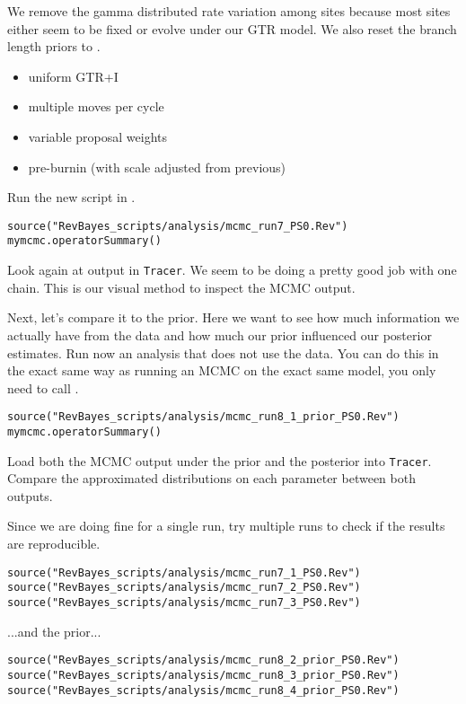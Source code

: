 We remove the gamma distributed rate variation among sites because most sites either seem to be fixed or evolve under our GTR model.
We also reset the branch length priors to .
\begin{itemize}
\item{uniform GTR+I}
\item{multiple moves per cycle}
\item{variable proposal weights}
\item{pre-burnin (with scale adjusted from previous)}
\end{itemize}
Run the new script in \RevBayes.
{\tt \begin{snugshade*}
\begin{lstlisting}
source("RevBayes_scripts/analysis/mcmc_run7_PS0.Rev")
mymcmc.operatorSummary()
\end{lstlisting}
\end{snugshade*}}
Look again at output in \verb!Tracer!.
We seem to be doing a pretty good job with one chain.
This is our visual method to inspect the MCMC output. 

Next, let's compare it to the prior.
Here we want to see how much information we actually have from the data and how much our prior influenced our posterior estimates.
Run now an analysis that does not use the data.
You can do this in \RevBayes the exact same way as running an MCMC on the exact same model, you only need to call .
{\tt \begin{snugshade*}
\begin{lstlisting}
source("RevBayes_scripts/analysis/mcmc_run8_1_prior_PS0.Rev")
mymcmc.operatorSummary()
\end{lstlisting}
\end{snugshade*}}
Load both the MCMC output under the prior and the posterior into \verb!Tracer!.
Compare the approximated distributions on each parameter between both outputs.

Since we are doing fine for a single run, try multiple runs to check if the results are reproducible.
{\tt \begin{snugshade*}
\begin{lstlisting}
source("RevBayes_scripts/analysis/mcmc_run7_1_PS0.Rev")
source("RevBayes_scripts/analysis/mcmc_run7_2_PS0.Rev")
source("RevBayes_scripts/analysis/mcmc_run7_3_PS0.Rev")
\end{lstlisting}
\end{snugshade*}}
...and the prior...
{\tt \begin{snugshade*}
\begin{lstlisting}
source("RevBayes_scripts/analysis/mcmc_run8_2_prior_PS0.Rev")
source("RevBayes_scripts/analysis/mcmc_run8_3_prior_PS0.Rev")
source("RevBayes_scripts/analysis/mcmc_run8_4_prior_PS0.Rev")
\end{lstlisting}
\end{snugshade*}}



